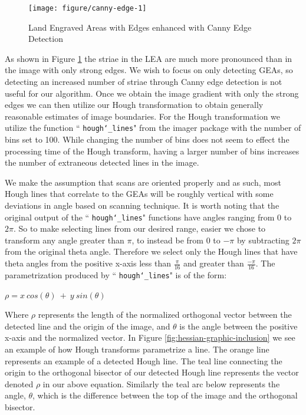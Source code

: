\documentclass[12pt]{article}\usepackage[]{graphicx}\usepackage[]{color}
\newenvironment{knitrout}{}{} %
\theoremstyle{nonumberplain}
\begin{document}
\begin{knitrout}
\color{fgcolor}\begin{figure}[H]

{\centering \texttt{[image: figure/canny-edge-1]} 

}

\caption[Land Engraved Areas with Edges enhanced with Canny Edge Detection]{Land Engraved Areas with Edges enhanced with Canny Edge Detection}\label{fig:canny-edge}
\end{figure}


\end{knitrout}

As shown in Figure \ref{fig:canny-edge} the striae in the LEA are much more pronounced than in the image with only strong edges. We wish to focus on only detecting GEAs, so detecting an increased number of striae through Canny edge detection is not useful for our algorithm. Once we obtain the image gradient with only the strong edges we can then utilize our Hough transformation to obtain generally reasonable estimates of image boundaries. For the Hough transformation we utilize the function `` \texttt{hough\char`_lines}" from the imager package with the number of bins set to 100. While changing the number of bins does not seem to effect the processing time of the Hough transform, having a larger number of bins increases the number of extraneous detected lines in the image. 

We make the assumption that scans are oriented properly and as such, most Hough lines that correlate to the GEAs will be roughly vertical with some deviations in angle based on scanning technique. It is worth noting that the original output of the `` \texttt{hough\char`_lines}" functions have angles ranging from 0 to $2\pi$. So to make selecting lines from our desired range, easier we chose to transform any angle greater than $\pi$, to instead be from 0 to $-\pi$ by subtracting $2\pi$ from the original theta angle. Therefore we select only the Hough lines that have theta angles from the positive x-axis less than $\frac{\pi}{16}$ and greater than $\frac{-\pi}{16}$. The parametrization produced by `` \texttt{hough\char`_lines}" is of the form:

\begin{center}
$\rho = x \ cos(\theta) \ + \ y \ sin(\theta)$
\end{center}

Where $\rho$ represents the length of the normalized orthogonal vector between the detected line and the origin of the image, and $\theta$ is the angle between the positive x-axis and the normalized vector. In Figure \ref{fig:hessian-graphic-inclusion} we see an example of how Hough transforms parametrize a line. The orange line represents an example of a detected Hough line. The teal line connecting the origin to the orthogonal bisector of our detected Hough line represents the vector denoted $\rho$ in our above equation. Similarly the teal arc below represents the angle, $\theta$, which is the difference between the top of the image and the orthogonal bisector. 
\end{document}
